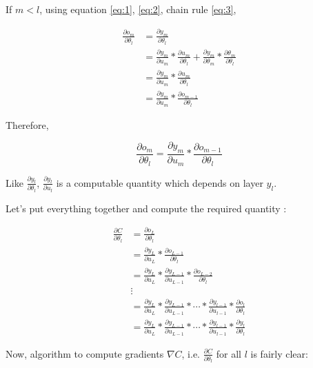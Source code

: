 \documentclass[a4paper]{tufte-handout}
\begin{document}
If \(m < l\), using equation \eqref{eq:1}, \eqref{eq:2}, chain rule \eqref{eq:3},

\begin{align*}
\frac{\partial o_m}{\partial \theta_l} &= \frac{\partial y_m}{\partial \theta_l}\\
&= \frac{\partial y_m}{\partial u_m} * \frac{\partial u_m}{\partial \theta_l} + \frac{\partial y_m}{\partial \theta_m} * \frac{\partial \theta_m}{\partial \theta_l}\\
&= \frac{\partial y_m}{\partial u_m} * \frac{\partial u_m}{\partial \theta_l}\\
&= \frac{\partial y_m}{\partial u_m} * \frac{\partial o_{m-1}}{\partial \theta_l}
\end{align*}


Therefore,

\begin{equation}
\frac{\partial o_m}{\partial \theta_l} = \frac{\partial y_m}{\partial u_m} * \frac{\partial o_{m-1}}{\partial \theta_l}
\label{eq:6}
\end{equation}

Like \(\frac{\partial y_l}{\partial \theta_l}\),
\(\frac{\partial y_l}{\partial u_l}\) is a computable quantity which
depends on layer \(y_l\).

\noindent Let's put everything together and compute the required quantity
:

\begin{align*}
\frac{\partial C}{\partial \theta_l} &= \frac{\partial o_L}{\partial \theta_l}\\
&= \frac{\partial y_L}{\partial u_L} * \frac{\partial o_{L-1}}{\partial \theta_l}\\
&= \frac{\partial y_L}{\partial u_L} * \frac{\partial y_{L-1}}{\partial u_{L-1}} * \frac{\partial o_{L-2}}{\partial \theta_l} \\
&\vdots \\
&= \frac{\partial y_L}{\partial u_L} * \frac{\partial y_{L-1}}{\partial u_{L-1}} * \cdots * \frac{\partial y_{l-1}}{\partial u_{l-1}} * \frac{\partial o_l}{\partial \theta_l}\\
&= \frac{\partial y_L}{\partial u_L} * \frac{\partial y_{L-1}}{\partial u_{L-1}} * \cdots * \frac{\partial y_{l-1}}{\partial u_{l-1}} * \frac{\partial y_l}{\partial \theta_l}
\end{align*}

Now, algorithm to compute gradients \(\nabla C\), i.e.
\(\frac{\partial C}{\partial \theta_l}\) for all \(l\) is fairly clear:
\end{document}
